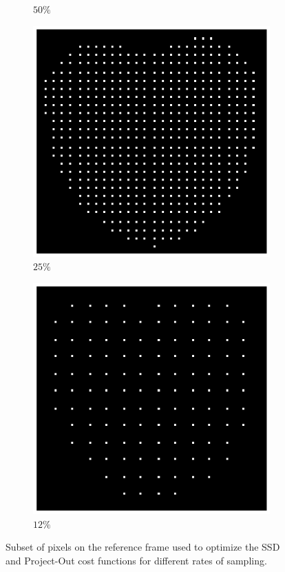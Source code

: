 \begin{figure}[t!]
\begin{subfigure}{0.16\textwidth}
		\caption{$50\%$}
		\label{fig:sampling_50}
	\end{subfigure}
	\begin{subfigure}{0.16\textwidth}
		\includegraphics[width=\textwidth]{figures/sampling_25.png}
		\caption{$25\%$}
		\label{fig:sampling_25}
	\end{subfigure}
	\begin{subfigure}{0.16\textwidth}
		\includegraphics[width=\textwidth]{figures/sampling_12.png}
		\caption{$12\%$}
		\label{fig:ini_12}
	\end{subfigure}
	\caption{Subset of pixels on the reference frame used to optimize the SSD and Project-Out cost functions for different rates of sampling.}
    \label{fig:sampling_masks}
\end{figure}


